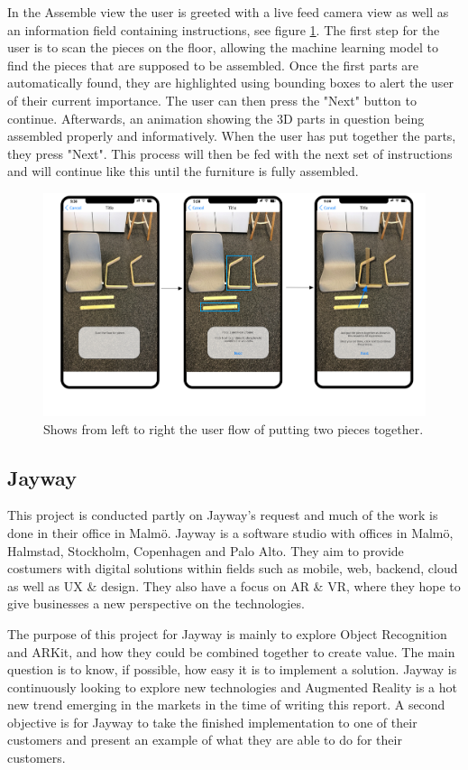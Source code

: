 In the Assemble view the user is greeted with a live feed camera view as well as an information field containing instructions, see figure \ref{fig:assemble-view}. The first step for the user is to scan the pieces on the floor, allowing the machine learning model to find the pieces that are supposed to be assembled. Once the first parts are automatically found, they are highlighted using bounding boxes to alert the user of their current importance. The user can then press the "Next" button to continue. Afterwards, an animation showing the 3D parts in question being assembled properly and informatively. When the user has put together the parts, they press "Next". This process will then be fed with the next set of instructions and will continue like this until the furniture is fully assembled.
\begin{figure}[hbtp]
\begin{center}
\includegraphics[height = 0.4\textheight]{./Images/AR_Scene.png}
\caption{Shows from left to right the user flow of putting two pieces together.}
\label{fig:assemble-view}
\end{center}
\end{figure}

\newpage

\subsection{Jayway}
This project is conducted partly on Jayway's request and much of the work is done in their office in Malmö.
Jayway is a software studio with offices in Malmö, Halmstad, Stockholm, Copenhagen and Palo Alto. They aim to provide costumers with digital solutions  within fields such as mobile, web, backend, cloud as well as UX \& design. They also have a focus on AR \& VR, where they hope to give businesses a new perspective on the technologies.


The purpose of this project for Jayway is mainly to explore Object Recognition  and ARKit, and how they could be combined together to create value. The main question is to know, if possible, how easy it is to implement a solution.
Jayway is continuously looking to explore new technologies and Augmented Reality is a hot new trend emerging in the markets in the time of writing this report.
A second objective is for Jayway to take the finished implementation to one of their customers and
present an example of what they are able to do for their customers.

\newpage
